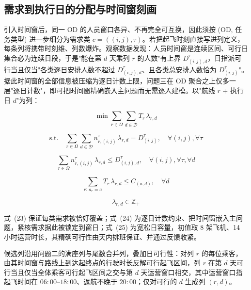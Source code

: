 \documentclass[zihao=-4,a4paper]{ctexart}
\begin{document}
\subsection{需求到执行日的分配与时间窗刻画}

引入时间窗后，同一 OD 的人员窗口各异、不再完全可互换，因此须按 (OD, 任务类型) 进一步细分为需求类 $c=((i,j),\tau)$。若把起飞时刻直接写进列定义，每条列将携带时刻维、列数爆炸。观察数据发现：人员时间窗是连续区间、可行日集合必为连续日段，于是"能在第 $d$ 天乘列 $r$ 的人数"有上界 $D_{(i,j),d}^{\tau}$，日指派可行当且仅当"各类逐日安排人数不超过 $D_{(i,j),d}^{\tau}$、且各类总安排人数恰为 $D_{(i,j)}^{\tau}$"。据此时间窗的全部信息被压缩为逐日计数上限，问题三在 OD 聚合之上仅多一层"逐日计数"，即可把时间窗精确嵌入主问题而无需逐人建模。以"航线 $r$ + 执行日 $d$"为列：

\begin{equation}
  \min \sum_{r\in\Omega}\sum_{d\in\mathcal{D}} T_r\,\lambda_{r,d}
\end{equation}

\begin{equation}
  \text{s.t.}\quad \sum_{r\in\Omega}\sum_{d\in\mathcal{D}} n_{r,(i,j)}^{\tau}\,\lambda_{r,d} = D_{(i,j)}^{\tau},\quad \forall(i,j),\forall\tau
\end{equation}

\begin{equation}
  \sum_{r\in\Omega} n_{r,(i,j)}^{\tau}\,\lambda_{r,d} \le D_{(i,j),d}^{\tau},\quad \forall(i,j),\forall\tau,\forall d
\end{equation}

\begin{equation}
  \sum_{r:\,a_r=a} T_r\,\lambda_{r,d} \le C_{(a,d)},\quad \forall d
\end{equation}

\begin{equation}
  \lambda_{r,d}\in\mathbb{Z}_+
\end{equation}

式~(23) 保证每类需求被恰好覆盖；式~(24) 为逐日计数约束、把时间窗嵌入主问题，紧核需求据此被锁定到窗日；式~(25) 为宽松日容量，初值取 8 架飞机、14 小时运营时长，其精确可行性由天内排班保证、并通过反馈收紧。

候选列沿用问题二的满座列与尾数合并列，叠加日可行性：对列 $r$ 的每位乘客，由其时间窗与路线上到达起终点的行驶时长反解可行起飞区间，列 $r$ 在第 $d$ 天可行当且仅当全体乘客可行起飞区间之交与第 $d$ 天运营窗口相交，其中运营窗口指起飞时间在 $06{:}00$--$18{:}00$、返航不晚于 $20{:}00$；仅对可行的 $d$ 生成列 $(r,d)$。
\end{document}
